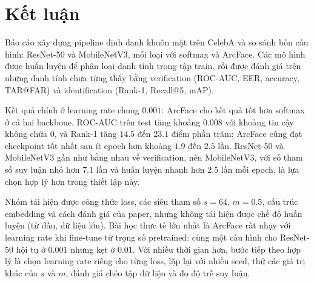 \documentclass[a4paper,12pt]{article}
\begin{document}
\section{Kết luận}\label{sec:conclusion}
Báo cáo xây dựng pipeline định danh khuôn mặt trên CelebA và so sánh bốn cấu hình: ResNet-50 và MobileNetV3, mỗi loại với softmax và ArcFace. Các mô hình được huấn luyện để phân loại danh tính trong tập train, rồi được đánh giá trên những danh tính chưa từng thấy bằng verification (ROC-AUC, EER, accuracy, TAR@FAR) và identification (Rank-1, Recall@5, mAP).

Kết quả chính ở learning rate chung $0.001$: ArcFace cho kết quả tốt hơn softmax ở cả hai backbone. ROC-AUC trên test tăng khoảng $0.008$ với khoảng tin cậy không chứa $0$, và Rank-1 tăng $14.5$ đến $23.1$ điểm phần trăm; ArcFace cũng đạt checkpoint tốt nhất sau ít epoch hơn khoảng $1.9$ đến $2.5$ lần. ResNet-50 và MobileNetV3 gần như bằng nhau về verification, nên MobileNetV3, với số tham số suy luận nhỏ hơn $7.1$ lần và huấn luyện nhanh hơn $2.5$ lần mỗi epoch, là lựa chọn hợp lý hơn trong thiết lập này.

Nhóm tái hiện được công thức loss, các siêu tham số $s = 64$, $m = 0.5$, cấu trúc embedding và cách đánh giá của paper, nhưng không tái hiện được chế độ huấn luyện (từ đầu, dữ liệu lớn). Bài học thực tế lớn nhất là ArcFace rất nhạy với learning rate khi fine-tune từ trọng số pretrained: cùng một cấu hình cho ResNet-50 hội tụ ở $0.001$ nhưng kẹt ở $0.01$. Với nhiều thời gian hơn, bước tiếp theo hợp lý là chọn learning rate riêng cho từng loss, lặp lại với nhiều seed, thử các giá trị khác của $s$ và $m$, đánh giá chéo tập dữ liệu và đo độ trễ suy luận.



\end{document}
